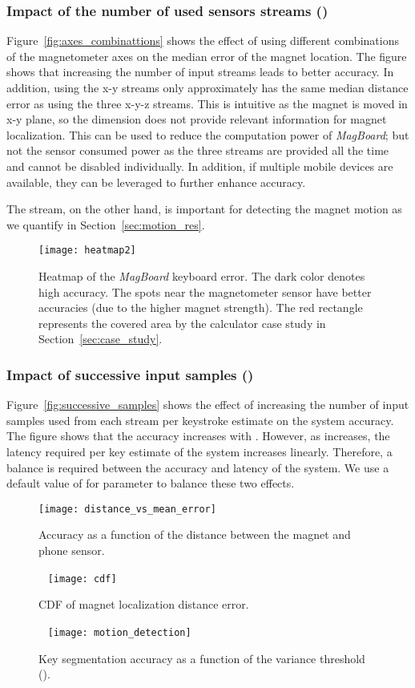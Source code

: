 \documentclass[conference]{IEEEtran}
\def \sys {\textit{MagBoard}}
\begin{document}
\subsubsection{Impact of the number of used sensors streams ()}
Figure~\ref{fig:axes_combinattions} shows the effect of using different combinations of the magnetometer axes on the median error of the magnet location. The figure shows that increasing the number of input streams leads to better accuracy. In addition, using the x-y streams only approximately has the same 
median distance error as using the three x-y-z streams. This is intuitive as the magnet is moved in x-y plane, so the  dimension does not provide relevant information for magnet localization. This can be used to reduce the computation power of \sys{}; 
but not the sensor consumed power as the three streams are provided all the time and cannot be disabled individually. 
In addition, if multiple mobile devices are available, they can be leveraged to further enhance accuracy.

The  stream, on the other hand, is important for detecting the magnet motion as we quantify in Section~\ref{sec:motion_res}.

\begin{figure}[!t]
\centering
\texttt{[image: heatmap2]}
\caption{Heatmap of the \sys{} keyboard error. The dark color denotes high accuracy. 
The spots near the magnetometer sensor have better accuracies (due to the higher magnet strength). 
 The red rectangle represents the covered area by the calculator case study in Section~\ref{sec:case_study}.}
\label{fig:heatmap}
\vspace{-0.2in}
\end{figure}

\subsubsection{Impact of successive input samples ()}

Figure~\ref{fig:successive_samples} shows the effect of increasing the number of input samples used from each stream per keystroke estimate on the system accuracy. The figure shows that the accuracy increases with . However, as  increases, the latency required per key estimate of the system increases linearly. Therefore, a balance is required between the accuracy and latency of the system. We use a default value of  for parameter  to balance these two effects. 

\begin{figure*}[!t]
 \texttt{[image: distance\_vs\_mean\_error]}
\caption{
Accuracy as a function of the distance between the magnet and phone sensor.}
\label{fig:distance_accuracy}
\endminipage\hfill~
  \texttt{[image: cdf]}
\caption{CDF of magnet localization distance error.}
\label{fig:cdf}
\endminipage\hfill~
\texttt{[image: motion\_detection]}
\caption{Key segmentation accuracy as a function of the variance threshold ().}
\label{fig:motion_detection_accuracy}
\endminipage
\vspace{-0.2in}
\end{figure*}
\end{document}

